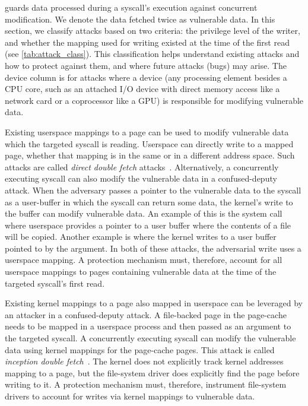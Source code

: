 \documentclass[letterpaper,twocolumn,10pt, anonymous]{article}
\begin{document}
\tiktok guards data processed during a syscall's execution against concurrent modification.
We denote the data fetched twice as vulnerable data.
In this section, we classify attacks based on two criteria: the 
privilege level of the writer, and whether the mapping used for writing 
existed at the time of the first read (see \autoref{tab:attack_class}).
This classification helps understand existing attacks and how to 
protect against them, and where future attacks (bugs) may arise.
The device column is for attacks where a device (any processing element 
besides a CPU core, such as an attached I/O device with direct memory access like a network card or 
a coprocessor like a GPU) is responsible for modifying vulnerable data.

Existing userspace mappings to a page can be used to modify 
vulnerable data which the targeted syscall is reading.
Userspace can directly write to a mapped page, whether that mapping is 
in the same or in a different address space. 
Such attacks are called \emph{direct double fetch} 
attacks~\cite{watson2007exploiting}.
Alternatively, a concurrently executing syscall can also modify the 
vulnerable data in a confused-deputy attack.
When the adversary passes a pointer to the vulnerable data to 
the syscall as a user-buffer in which the syscall can return some 
data, the kernel's write to the buffer can modify vulnerable data.
An example of this is the  system call where userspace 
provides a pointer to a user buffer where the contents of a file 
will be copied.
Another example is  where the kernel writes to 
a user buffer pointed to by the  argument.
In both of these attacks, the adversarial write uses a userspace
mapping. 
A protection mechanism must, therefore, account for all userspace 
mappings to pages containing vulnerable data at the time of the 
targeted syscall's first read.

Existing kernel mappings to a page also mapped in userspace can be 
leveraged by an attacker in a confused-deputy attack.
A file-backed page in the page-cache needs to be mapped in a
userspace process and then passed as an argument to the targeted syscall.
A concurrently executing  syscall can modify the 
vulnerable data using kernel mappings for the page-cache pages.
This attack is called \emph{inception double fetch}~\cite{watson2007exploiting}.
The kernel does not explicitly track kernel addresses mapping to a page, 
but the file-system driver does explicitly find the page before writing to it.
A protection mechanism must, therefore, instrument file-system 
drivers to account for writes via kernel mappings to vulnerable data.
\end{document}
